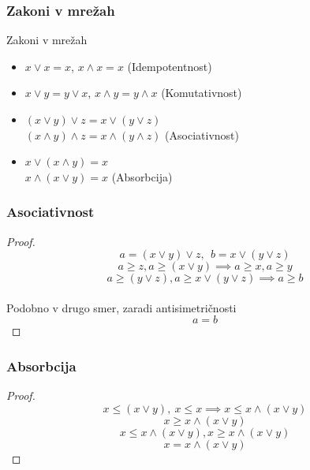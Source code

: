 \documentclass{beamer}
\begin{document}
\begin{frame}
\frametitle{Zakoni v mrežah}
\begin{block}{Zakoni v mrežah}
\begin{itemize}
\item $x \lor x = x$, $x \land x = x$ (Idempotentnost)
\item $x \lor y = y \lor x$, $x \land y = y \land x$ (Komutativnost)
\item $(x \lor y) \lor z = x \lor (y \lor z)$\\ $(x \land y) \land z = x \land (y \land z)$ (Asociativnost)
\item $ x \lor (x \land y) = x$\\ $x \land (x \lor y) = x$ (Absorbcija)
\end{itemize}
\end{block}
\end{frame}


\begin{frame}
\frametitle{Asociativnost}
\begin{proof}
$$a = (x \lor y) \lor z, \ \ b = x \lor (y \lor z)$$ 
$$a \geq z, a \geq (x \lor y) \implies a \geq x, a \geq y$$\pause 
$$a \geq (y \lor z), a \geq x \lor (y \lor z) \implies a \geq b $$ \\ 
\centering Podobno v drugo smer, zaradi antisimetričnosti
$$ a = b$$

\end{proof}

\end{frame}

\begin{frame}
\frametitle{Absorbcija}


\begin{proof}
$$ x \leq (x \lor y), \ x \leq x \implies x \leq x \land (x \lor y)$$
$$x \geq x \land (x \lor y)$$
$$x \leq x \land (x \lor y), x \geq x \land (x \lor y)$$ \pause
$$x = x \land (x \lor y)$$
\end{proof}

\end{frame}
\end{document}
